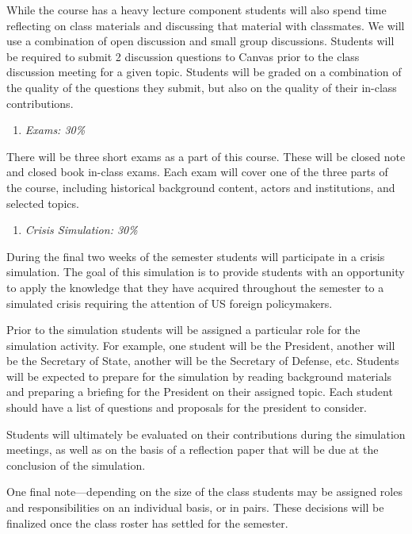 \documentclass[
  letterpaper,
  DIV=11,
  numbers=noendperiod]{scrartcl}
\providecommand{\tightlist}{%
  \setlength{\itemsep}{0pt}\setlength{\parskip}{0pt}}
\begin{document}
While the course has a heavy lecture component students will also spend
time reflecting on class materials and discussing that material with
classmates. We will use a combination of open discussion and small group
discussions. Students will be required to submit 2 discussion questions
to Canvas prior to the class discussion meeting for a given topic.
Students will be graded on a combination of the quality of the questions
they submit, but also on the quality of their in-class contributions.

\begin{enumerate}
\def\labelenumi{\arabic{enumi}.}
\setcounter{enumi}{2}
\tightlist
\item
  \emph{Exams: 30\%}
\end{enumerate}

There will be three short exams as a part of this course. These will be
closed note and closed book in-class exams. Each exam will cover one of
the three parts of the course, including historical background content,
actors and institutions, and selected topics.

\begin{enumerate}
\def\labelenumi{\arabic{enumi}.}
\setcounter{enumi}{3}
\tightlist
\item
  \emph{Crisis Simulation: 30\%}
\end{enumerate}

During the final two weeks of the semester students will participate in
a crisis simulation. The goal of this simulation is to provide students
with an opportunity to apply the knowledge that they have acquired
throughout the semester to a simulated crisis requiring the attention of
US foreign policymakers.

Prior to the simulation students will be assigned a particular role for
the simulation activity. For example, one student will be the President,
another will be the Secretary of State, another will be the Secretary of
Defense, etc. Students will be expected to prepare for the simulation by
reading background materials and preparing a briefing for the President
on their assigned topic. Each student should have a list of questions
and proposals for the president to consider.

Students will ultimately be evaluated on their contributions during the
simulation meetings, as well as on the basis of a reflection paper that
will be due at the conclusion of the simulation.

One final note---depending on the size of the class students may be
assigned roles and responsibilities on an individual basis, or in pairs.
These decisions will be finalized once the class roster has settled for
the semester.
\end{document}
